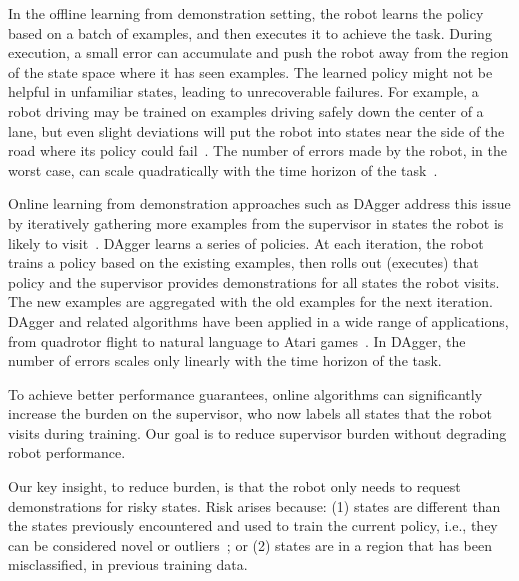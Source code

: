\documentclass[10pt, conference]{ieeeconf}      %
\newcommand{\adnote}[1]{\ifthenelse{ \boolean{include-notes}}%
 {\textcolor{blue}{\textbf{AD: #1}}}{}}
\begin{document}
In the offline learning from demonstration setting, the robot learns the policy based on a batch of examples, and then executes it to achieve the task.  During execution, a small error can accumulate and push the robot away from the region of the state space where it has seen examples. The learned policy might not be helpful in unfamiliar states, leading to unrecoverable failures.  For example, a robot driving may be trained on examples driving safely down the center of a lane, but even slight deviations will put the robot into states near the side of the road where its policy could  fail~\cite{pomerleau1989alvinn}. The number of errors made by the robot, in the worst case,  can scale quadratically with the time horizon of the task~\cite{ross2010efficient}.




Online learning from demonstration approaches such as DAgger address this issue by iteratively gathering more examples from the supervisor in states the robot is likely to visit~\cite{grollman2007dogged,ross2010efficient,ross2010reduction}. DAgger learns a series of policies. At each iteration, the robot trains a policy based on the existing examples, then rolls out (executes) that policy and the supervisor provides demonstrations for all states the robot visits. The new examples are aggregated with the old examples for the next iteration. DAgger and related algorithms have been applied in a wide range of applications, from quadrotor flight to natural language to Atari games~\cite{NIPS2014_5421,duvallet2013imitation,ross2013learning}. In DAgger, the number of errors scales only linearly with the time horizon of the task.

To achieve better performance guarantees, online algorithms can significantly increase the burden on the supervisor, who now labels all states that the robot visits during training.  Our goal is to reduce supervisor burden without degrading robot performance.

Our key insight, to reduce burden, is that the robot only needs to request demonstrations for risky states. Risk arises because:  (1) states are different than the states previously encountered and used to train the current policy, i.e., they can be considered novel or outliers~\cite{hodge2004survey}; or (2) states are in a region that has been misclassified, in previous training data.
\end{document}
